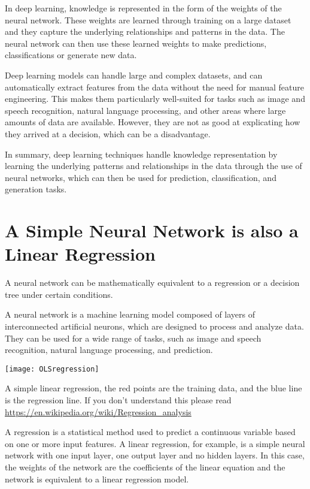 In deep learning, knowledge is represented in the form of the weights of the neural network. These weights are learned through training on a large dataset and they capture the underlying relationships and patterns in the data. The neural network can then use these learned weights to make predictions, classifications or generate new data.

Deep learning models can handle large and complex datasets, and can automatically extract features from the data without the need for manual feature engineering. This makes them particularly well-suited for tasks such as image and speech recognition, natural language processing, and other areas where large amounts of data are available. However, they are not as good at explicating how they arrived at a decision, which can be a disadvantage.

In summary, deep learning techniques handle knowledge representation by learning the underlying patterns and relationships in the data through the use of neural networks, which can then be used for prediction, classification, and generation tasks.

\section{A Simple Neural Network is also a Linear Regression}

A neural network can be mathematically equivalent to a regression or a decision tree under certain conditions.

A neural network is a machine learning model composed of layers of interconnected artificial neurons, which are designed to process and analyze data. They can be used for a wide range of tasks, such as image and speech recognition, natural language processing, and prediction.

\begin{marginfigure}[-5.5cm]
	\texttt{[image: OLSregression]}
        \caption{A simple linear regression, the red points are the training data, and the blue line is the regression line. If you don't understand this please read \url{https://en.wikipedia.org/wiki/Regression_analysis}}
\end{marginfigure}


A regression is a statistical method used to predict a continuous variable based on one or more input features. A linear regression, for example, is a simple neural network with one input layer, one output layer and no hidden layers. In this case, the weights of the network are the coefficients of the linear equation and the network is equivalent to a linear regression model.

